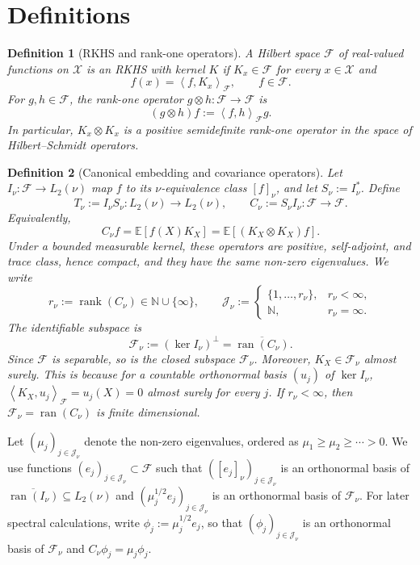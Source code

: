 \documentclass[11pt]{article}
\newtheorem{definition}{Definition}[section]
\newcommand{\E}{\mathbb{E}}
\newcommand{\F}{\mathcal{F}}
\newcommand{\X}{\mathcal{X}}
\newcommand{\ran}{\operatorname{ran}}
\newcommand{\inner}[2]{\left\langle #1,#2\right\rangle}
\begin{document}
\section{Definitions}

\begin{definition}[RKHS and rank-one operators]
A Hilbert space $\F$ of real-valued functions on $\X$ is an RKHS with kernel $K$ if $K_x\in\F$ for every $x\in\X$ and
\[
  f(x)=\inner{f}{K_x}_{\F},\qquad f\in\F.
\]
For $g,h\in\F$, the rank-one operator $g\otimes h:\F\to\F$ is
\[
  (g\otimes h)f:=\inner{f}{h}_{\F}g.
\]
In particular, $K_x\otimes K_x$ is a positive semidefinite rank-one operator in the space of Hilbert--Schmidt operators.
\end{definition}

\begin{definition}[Canonical embedding and covariance operators]
Let $I_\nu:\F\to L_2(\nu)$ map $f$ to its $\nu$-equivalence class $[f]_\nu$, and let $S_\nu:=I_\nu^*$. Define
\[
  T_\nu:=I_\nu S_\nu:L_2(\nu)\to L_2(\nu),\qquad
  C_\nu:=S_\nu I_\nu:\F\to\F.
\]
Equivalently,
\[
  C_\nu f=\E[f(X)K_X]=\E[(K_X\otimes K_X)f].
\]
Under a bounded measurable kernel, these operators are positive, self-adjoint, and trace class, hence compact, and they have the same non-zero eigenvalues. We write
\[
  r_\nu:=\operatorname{rank}(C_\nu)\in\mathbb N\cup\{\infty\},
  \qquad
  \mathcal J_\nu
  :=
  \begin{cases}
    \{1,\ldots,r_\nu\}, & r_\nu<\infty,\\
    \mathbb N, & r_\nu=\infty.
  \end{cases}
\]
The identifiable subspace is
\[
  \F_\nu:=(\ker I_\nu)^\perp=\overline{\ran(C_\nu)}.
\]
Since $\F$ is separable, so is the closed subspace $\F_\nu$. Moreover, $K_X\in\F_\nu$ almost surely. This is because for a countable orthonormal basis $(u_j)$ of $\ker I_\nu$, $\inner{K_X}{u_j}_{\F}=u_j(X)=0$ almost surely for every $j$.
If $r_\nu<\infty$, then $\F_\nu=\ran(C_\nu)$ is finite dimensional. 
\end{definition}

Let $(\mu_j)_{j\in\mathcal J_\nu}$ denote the non-zero eigenvalues, ordered as $\mu_1\ge\mu_2\ge\cdots>0$. We use functions $(e_j)_{j\in\mathcal J_\nu}\subset\F$ such that $([e_j]_\nu)_{j\in\mathcal J_\nu}$ is an orthonormal basis of $\overline{\ran(I_\nu)}\subseteq L_2(\nu)$ and $(\mu_j^{1/2}e_j)_{j\in\mathcal J_\nu}$ is an orthonormal basis of $\F_\nu$. For later spectral calculations, write $\phi_j:=\mu_j^{1/2}e_j$, so that $(\phi_j)_{j\in\mathcal J_\nu}$ is an orthonormal basis of $\F_\nu$ and $C_\nu\phi_j=\mu_j\phi_j$.
\end{document}
